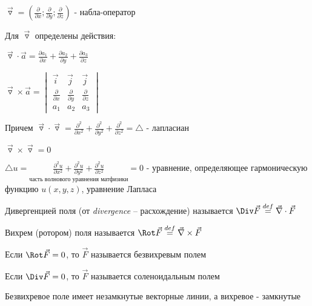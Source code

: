 \documentclass[12pt]{article}
\begin{document}
    $\overrightarrow{\triangledown} = \left(\frac{\partial}{\partial x}; \frac{\partial}{\partial y}; \frac{\partial}{\partial z}\right)$ - набла-оператор

    \Nota Для $\overrightarrow{\triangledown}$ определены действия:

    $\overrightarrow{\triangledown} \cdot \overrightarrow{a} = \frac{\partial a_1}{\partial x} + \frac{\partial a_2}{\partial y} + \frac{\partial a_3}{\partial z}$

    $\overrightarrow{\triangledown} \times \overrightarrow{a} =
    \begin{vmatrix}
        \overrightarrow{i}          & \overrightarrow{j}          & \overrightarrow{j}          \\
        \frac{\partial}{\partial x} & \frac{\partial}{\partial y} & \frac{\partial}{\partial z} \\
        a_1                         & a_2                         & a_3
    \end{vmatrix}$

    Причем $\overrightarrow{\triangledown} \cdot \overrightarrow{\triangledown} = \frac{\partial^2}{\partial x^2} + \frac{\partial^2}{\partial y^2} + \frac{\partial^2}{\partial z^2} = \triangle$ - лапласиан

    $\overrightarrow{\triangledown} \times \overrightarrow{\triangledown} = 0$

    \Nota $\triangle u = \underset{\text{часть волнового уравнения матфизики}}{\frac{\partial^2 u}{\partial x^2} + \frac{\partial^2 u}{\partial y^2} + \frac{\partial^2 u}{\partial z^2}} = 0$ - уравнение, определяющее гармоническую функцию $u(x, y, z)$, уравнение Лапласа

    \hypertarget{divergence}{}

     Дивергенцией поля (от \textit{divergence} -- расхождение) называется
    $\Div \vec{F} \stackrel{def}{=} \vec\nabla \cdot \vec{F}$

    \hypertarget{rotor}{}

     Вихрем (ротором) поля называется $\Rot \vec{F} \stackrel{def}{=} \vec\nabla \times \vec{F}$

    \hypertarget{vectorfieldtypes}{}

     Если $\Rot \vec{F} = 0$, то $\vec{F}$ называется безвихревым полем

     Если $\Div \vec{F} = 0$, то $\vec{F}$ называется соленоидальным полем

    \Nota Безвихревое поле имеет незамкнутые векторные линии, а вихревое - замкнутые
\end{document}
